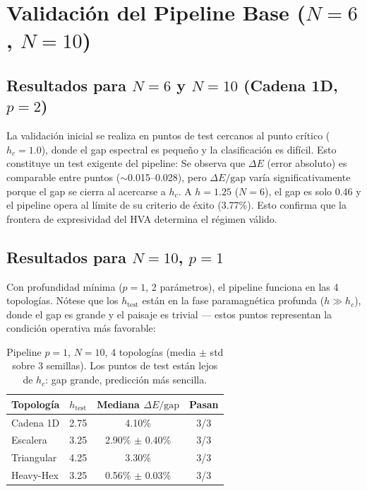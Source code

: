 \documentclass[11pt,a4paper,spanish]{book}
\begin{document}
\section{Validación del Pipeline Base ($N = 6$, $N = 10$)}

\subsection{Resultados para $N = 6$ y $N = 10$ (Cadena 1D, $p = 2$)}

La validación inicial se realiza en puntos de test cercanos al punto crítico ($h_c = 1.0$), donde el gap espectral es pequeño y la clasificación es difícil. Esto constituye un test exigente del pipeline:
Se observa que $\Delta E$ (error absoluto) es comparable entre puntos ($\sim$0.015--0.028), pero $\Delta E/\text{gap}$ varía significativamente porque el gap se cierra al acercarse a $h_c$. A $h = 1.25$ ($N = 6$), el gap es solo 0.46 y el pipeline opera al límite de su criterio de éxito (3.77\%). Esto confirma que la frontera de expresividad del HVA determina el régimen válido.

\subsection{Resultados para $N = 10$, $p = 1$}

Con profundidad mínima ($p = 1$, 2 parámetros), el pipeline funciona en las 4 topologías. Nótese que los $h_{\text{test}}$ están en la fase paramagnética profunda ($h \gg h_c$), donde el gap es grande y el paisaje es trivial --- estos puntos representan la condición operativa más favorable:

\begin{table}[h]
\centering
\caption{Pipeline $p = 1$, $N = 10$, 4 topologías (media $\pm$ std sobre 3 semillas). Los puntos de test están lejos de $h_c$: gap grande, predicción más sencilla.}
\label{tab:results_p1}
\begin{tabular}{lccc}
\toprule
\textbf{Topología} & \textbf{$h_{\text{test}}$} & \textbf{Mediana $\Delta E/\text{gap}$} & \textbf{Pasan} \\
\midrule
Cadena 1D & 2.75 & 4.10\% & 3/3 \\
Escalera & 3.25 & 2.90\% $\pm$ 0.40\% & 3/3 \\
Triangular & 4.25 & 3.30\% & 3/3 \\
Heavy-Hex & 3.25 & 0.56\% $\pm$ 0.03\% & 3/3 \\
\bottomrule
\end{tabular}
\end{table}
\end{document}
